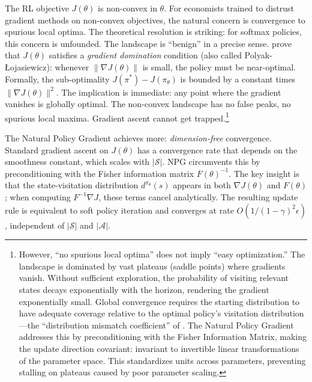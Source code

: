 The RL objective $J(\theta)$ is non-convex in $\theta$. For economists trained to distrust gradient methods on non-convex objectives, the natural concern is convergence to spurious local optima. The theoretical resolution is striking: for softmax policies, this concern is unfounded. The landscape is ``benign'' in a precise sense. \citet{agarwal2021theory} prove that $J(\theta)$ satisfies a \emph{gradient domination} condition (also called Polyak-\L{}ojasiewicz): whenever $\|\nabla J(\theta)\|$ is small, the policy must be near-optimal. Formally, the sub-optimality $J(\pi^*) - J(\pi_\theta)$ is bounded by a constant times $\|\nabla J(\theta)\|^2$. The implication is immediate: any point where the gradient vanishes is globally optimal. The non-convex landscape has no false peaks, no spurious local maxima. Gradient ascent cannot get trapped.\footnote{However, ``no spurious local optima'' does not imply ``easy optimization.'' The landscape is dominated by vast plateaus (saddle points) where gradients vanish. Without sufficient exploration, the probability of visiting relevant states decays exponentially with the horizon, rendering the gradient exponentially small. Global convergence requires the starting distribution to have adequate coverage relative to the optimal policy's visitation distribution---the ``distribution mismatch coefficient'' of \citet{agarwal2021theory}. The Natural Policy Gradient addresses this by preconditioning with the Fisher Information Matrix, making the update direction covariant: invariant to invertible linear transformations of the parameter space. This standardizes units across parameters, preventing stalling on plateaus caused by poor parameter scaling.}

The Natural Policy Gradient achieves more: \emph{dimension-free} convergence. Standard gradient ascent on $J(\theta)$ has a convergence rate that depends on the smoothness constant, which scales with $|\mathcal{S}|$. NPG circumvents this by preconditioning with the Fisher information matrix $F(\theta)^{-1}$. The key insight is that the state-visitation distribution $d^{\pi_\theta}(s)$ appears in both $\nabla J(\theta)$ and $F(\theta)$; when computing $F^{-1} \nabla J$, these terms cancel analytically. The resulting update rule is equivalent to soft policy iteration and converges at rate $O(1/(1-\gamma)^2 \epsilon)$, independent of $|\mathcal{S}|$ and $|\mathcal{A}|$.

